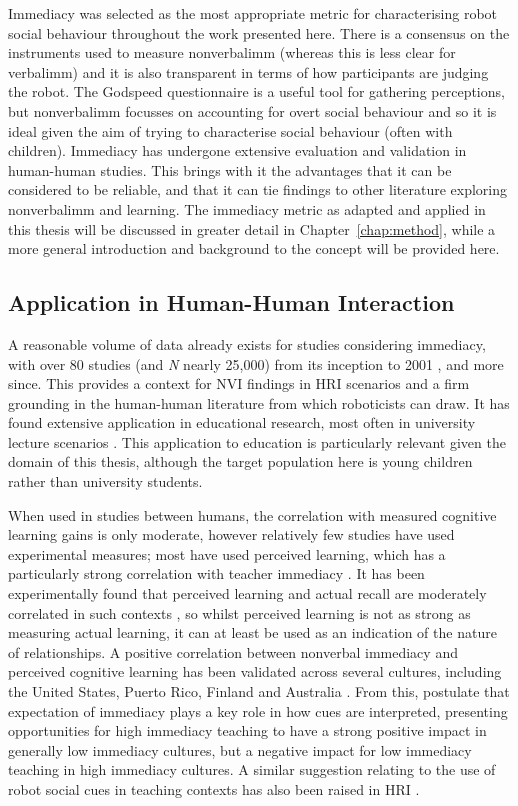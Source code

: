 Immediacy was selected as the most appropriate metric for characterising robot social behaviour throughout the work presented here. There is a consensus on the instruments used to measure \gls{nonverbalimm} (whereas this is less clear for \gls{verbalimm}) and it is also transparent in terms of how participants are judging the robot. The Godspeed questionnaire is a useful tool for gathering perceptions, but \gls{nonverbalimm} focusses on accounting for overt social behaviour and so it is ideal given the aim of trying to characterise social behaviour (often with children). Immediacy has undergone extensive evaluation and validation in human-human studies. This brings with it the advantages that it can be considered to be reliable, and that it can tie findings to other literature exploring \gls{nonverbalimm} and \gls{learning}. The \gls{immediacy} metric as adapted and applied in this thesis will be discussed in greater detail in Chapter~\ref{chap:method}, while a more general introduction and background to the concept will be provided here.

\subsection{Application in Human-Human Interaction}
A reasonable volume of data already exists for studies considering immediacy, with over 80 studies (and \textit{N} nearly 25,000) from its inception to 2001 \citep{witt2004meta}, and more since. This provides a context for NVI findings in HRI scenarios and a firm grounding in the human-human literature from which roboticists can draw. It has found extensive application in educational research, most often in university lecture scenarios \citep{witt2004meta}. This application to education is particularly relevant given the domain of this thesis, although the target population here is young children rather than university students.

When used in studies between humans, the correlation with measured cognitive learning gains is only moderate, however relatively few studies have used experimental measures; most have used perceived learning, which has a particularly strong correlation with teacher immediacy \citep{witt2004meta}. It has been experimentally found that perceived learning and actual recall are moderately correlated in such contexts \citep{chesebro2000relationship}, so whilst perceived learning is not as strong as measuring actual learning, it can at least be used as an indication of the nature of relationships. A positive correlation between nonverbal immediacy and perceived cognitive learning has been validated across several cultures, including the United States, Puerto Rico, Finland and Australia \citep{mccroskey1996nonverbal}. From this, \citet{mccroskey1996nonverbal} postulate that expectation of immediacy plays a key role in how cues are interpreted, presenting opportunities for high immediacy teaching to have a strong positive impact in generally low immediacy cultures, but a negative impact for low immediacy teaching in high immediacy cultures. A similar suggestion relating to the use of robot social cues in teaching contexts has also been raised in HRI \citep{kennedy2015less}.

